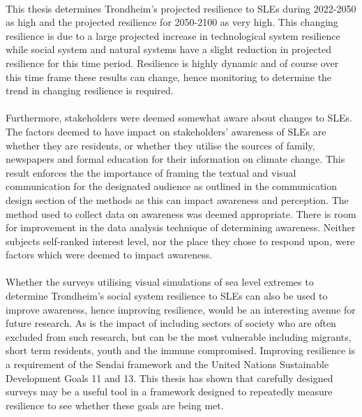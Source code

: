 \paragraph{}
This thesis determines Trondheim's projected resilience to SLEs during 2022-2050 as high and the projected resilience for 2050-2100 as very high. This changing resilience is due to a large projected increase in technological system resilience while social system and natural systems have a slight reduction in projected resilience for this time period. Resilience is highly dynamic and of course over this time frame these results can change, hence monitoring to determine the trend in changing resilience is required.

\paragraph{}
Furthermore, stakeholders were deemed somewhat aware about changes to SLEs. The factors deemed to have impact on stakeholders' awareness of SLEs are whether they are residents, or whether they utilise the sources of family, newspapers and formal education for their information on climate change. This result enforces the the importance of framing the textual and visual communication for the designated audience as outlined in the communication design section of the methods as this can impact awareness and perception.  The method used to collect data on awareness was deemed appropriate. There is room for improvement in the data analysis technique of determining awareness. Neither subjects self-ranked interest level, nor the place they chose to respond upon, were factors which were deemed to impact awareness.
\paragraph{}



Whether the surveys utilising visual simulations of sea level extremes to determine Trondheim's social system resilience to SLEs can also be used to improve awareness, hence improving resilience, would be an interesting avenue for future research. As is the impact of including sectors of society who are often excluded from such research, but can be the most vulnerable including migrants, short term residents, youth and the immune compromised. Improving resilience is a requirement of the Sendai framework and the United Nations Sustainable Development Goals 11 and 13. This thesis has shown that carefully designed surveys may be a useful tool in a framework designed to repeatedly measure resilience to see whether these goals are being met.


